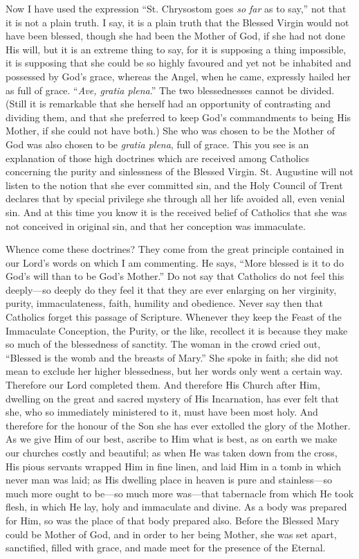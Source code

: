 Now I have used the expression ``St.
Chrysostom goes \emph{so far} as to say,'' not that it is not a plain
truth. I say, it is a plain truth that the Blessed Virgin would not
have been blessed, though she had been the Mother of God, if she had
not done His will, but it is an extreme thing to say, for it is
supposing a thing impossible, it is supposing that she could be so
highly favoured and yet not be inhabited and possessed by God's grace,
whereas the Angel, when he came, expressly hailed her as full of
grace. ``\emph{Ave, gratia plena}.'' The two blessednesses cannot be
divided. (Still it is remarkable that she herself had an opportunity
of contrasting and dividing them, and that she preferred to keep God's
commandments to being His Mother, if she could not have both.) She who
was chosen to be the Mother of God was also chosen to be \emph{gratia
plena}, full of grace. This you see is an explanation of those high
doctrines which are received among Catholics concerning the purity and
sinlessness of the Blessed Virgin. St. Augustine will not listen to
the notion that she ever committed sin, and the Holy Council of Trent
declares that by special privilege she through all her life avoided
all, even venial sin. And at this time you know it is the received
belief of Catholics that she was not conceived in original sin, and
that her conception was immaculate.

Whence come these doctrines? They come from the
great principle contained in our Lord's words on which I am
commenting. He says, ``More blessed is it to do God's will than to
be God's Mother.'' Do not say that Catholics do not feel this
deeply—so deeply do they feel it that they are ever enlarging on her
virginity, purity, immaculateness, faith, humility and obedience.
Never say then that Catholics forget this passage of Scripture.
Whenever they keep the Feast of the Immaculate Conception, the Purity,
or the like, recollect it is because they make so much of the
blessedness of sanctity. The woman in the crowd cried out,
``Blessed is the womb and the breasts of Mary.'' She spoke in
faith; she did not mean to exclude her higher blessedness, but her
words only went a certain way. Therefore our Lord completed them. And
therefore His Church after Him, dwelling on the great and sacred
mystery of His Incarnation, has ever felt that she, who so immediately
ministered to it, must have been most holy. And therefore for the
honour of the Son she has ever extolled the glory of the Mother. As we
give Him of our best, ascribe to Him what is best, as on earth we make
our churches costly and beautiful; as when He was taken down from the
cross, His pious servants wrapped Him in fine linen, and laid Him in a
tomb in which never man was laid; as His dwelling place in heaven is
pure and stainless—so much more ought to be—so much more
was—that tabernacle from which He took flesh, in which He lay,
holy and immaculate and divine. As a body was prepared for Him, so was
the place of that body prepared also. Before the Blessed Mary could be
Mother of God, and in order to her being Mother, she was set apart,
sanctified, filled with grace, and made meet for the presence of the
Eternal.

